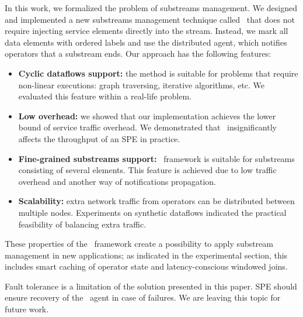 \label {fs-acker-conclusion}

In this work, we formalized the problem of substreams management. We designed and implemented a new substreams management technique called \tracker\ that does not require injecting service elements directly into the stream. Instead, we mark all data elements with ordered labels and use the distributed agent, which notifies operators that a substream ends. Our approach has the following features:

\begin{itemize}
     \item {\bf Cyclic dataflows support:} the method is suitable for problems that require non-linear executions: graph traversing, iterative algorithms, etc. We evaluated this feature within a real-life problem.
     \item {\bf Low overhead:} we showed that our implementation achieves the lower bound of service traffic overhead. We demonstrated that \tracker\ insignificantly affects the throughput of an SPE in practice.
     \item {\bf Fine-grained substreams support:} \tracker\ framework is suitable for substreams consisting of several elements. This feature is achieved due to low traffic overhead and another way of notifications propagation.
     \item {\bf Scalability:} extra network traffic from operators can be distributed between multiple nodes. Experiments on synthetic dataflows indicated the practical feasibility of balancing extra traffic.
\end{itemize}

These properties of the \tracker\ framework create a possibility to apply substream management in new applications; as indicated in the experimental section, this includes smart caching of operator state and latency-conscious windowed joins.

Fault tolerance is a limitation of the solution presented in this paper. SPE should ensure recovery of the \tracker\ agent in case of failures. We are leaving this topic for future work.
